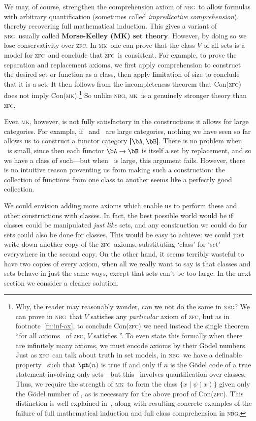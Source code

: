 \documentclass[12pt]{amsart}
\def\zfc{\textsc{zfc}}
\def\nbg{\textsc{nbg}}
\def\mk{\textsc{mk}}
\begin{document}
We may, of course, strengthen the comprehension axiom of \nbg\ to
allow formulas with arbitrary quantification (sometimes called
\emph{impredicative comprehension}), thereby recovering full
mathematical induction.  This gives a variant of \nbg\ usually called
\textbf{Morse-Kelley (MK) set theory}.  However, by doing so we lose
conservativity over \zfc.  In \mk\ one can prove that the class $V$ of
all sets is a model for \zfc\ and conclude that \zfc\ is consistent.
For example, to prove the separation and replacement axioms, we first
apply comprehension to construct the desired set or function as a
class, then apply limitation of size to conclude that it is a set.  It
then follows from the incompleteness theorem that Con(\zfc) does not
imply Con(\mk).\footnote{Why, the reader may reasonably wonder, can we
  not do the same in \nbg?  We can prove in \nbg\ that $V$ satisfies
  any \emph{particular} axiom of \zfc, but as in
  footnote~\ref{fn:inf-ax}, to conclude Con(\zfc) we need instead the
  single theorem ``for all axioms \psi\ of \zfc, $V$ satisfies \psi''.
  To even state this formally when there are infinitely many axioms,
  we must encode axioms by their G\"odel numbers.  Just as \zfc\ can
  talk about truth in set models, in \nbg\ we have a definable
  property \ph\ such that $\ph(n)$ is true if and only if $n$ is the
  G\"odel code of a true statement involving only sets---but this \ph\
  involves quantification over classes.  Thus, we require the strength
  of \mk\ to form the class $\{x \mid \psi(x)\}$ given only the
  G\"odel number of \psi, as is necessary for the above proof of
  Con(\zfc).  This distinction is well explained
  in~\cite{mostowski:impred,mostowski:cor-impred}, along with
  resulting concrete examples of the failure of full mathematical
  induction and full class comprehension in \nbg.}  So unlike \nbg,
\mk\ is a genuinely stronger theory than \zfc.

Even \mk, however, is not fully satisfactory in the constructions it
allows for large categories.  For example, if \bA\ and \bB\ are large
categories, nothing we have seen so far allows us to construct a
functor category $\pmb[\bA,\bB\pmb]$.  There is no problem when \bA\
is small, since then each functor $\bA\to\bB$ is itself a set by
replacement, and so we have a class of such---but when \bA\ is large,
this argument fails.  However, there is no intuitive reason preventing
us from making such a construction: the collection of functions from
one class to another seems like a perfectly good collection.

We could envision adding more axioms which enable us to perform these
and other constructions with classes.  In fact, the best possible
world would be if classes could be manipulated \emph{just like} sets,
and any construction we could do for sets could also be done for
classes.  This would be easy to achieve: we could just write down
another copy of the \zfc\ axioms, substituting `class' for `set'
everywhere in the second copy.  On the other hand, it seems terribly
wasteful to have two copies of every axiom, when all we really want to
say is that classes and sets behave in just the same ways, except that
sets can't be too large.  In the next section we consider a cleaner
solution.
\end{document}
